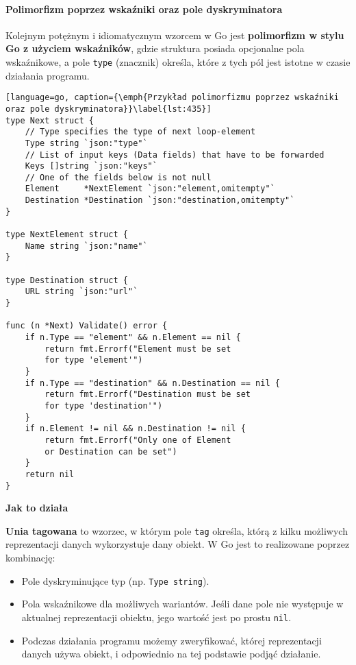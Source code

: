\paragraph{Polimorfizm poprzez wskaźniki oraz pole dyskryminatora}

Kolejnym potężnym i idiomatycznym wzorcem w Go jest \textbf{polimorfizm w stylu Go z użyciem wskaźników}, gdzie struktura posiada opcjonalne pola wskaźnikowe, a pole \texttt{type} (znacznik) określa, które z tych pól jest istotne w czasie działania programu.

\begin{lstlisting}[language=go, caption={\emph{Przykład polimorfizmu poprzez wskaźniki oraz pole dyskryminatora}}\label{lst:435}]
type Next struct {
	// Type specifies the type of next loop-element
	Type string `json:"type"`
	// List of input keys (Data fields) that have to be forwarded
	Keys []string `json:"keys"`
	// One of the fields below is not null
	Element     *NextElement `json:"element,omitempty"`
	Destination *Destination `json:"destination,omitempty"`
}

type NextElement struct {
	Name string `json:"name"`
}

type Destination struct {
	URL string `json:"url"`
}

func (n *Next) Validate() error {
	if n.Type == "element" && n.Element == nil {
		return fmt.Errorf("Element must be set 
        for type 'element'")
	}
	if n.Type == "destination" && n.Destination == nil {
		return fmt.Errorf("Destination must be set 
        for type 'destination'")
	}
	if n.Element != nil && n.Destination != nil {
		return fmt.Errorf("Only one of Element 
        or Destination can be set")
	}
	return nil
}
\end{lstlisting}

\textbf{Jak to działa}

\textbf{Unia tagowana} to wzorzec, w którym pole \texttt{tag} określa, którą z kilku możliwych reprezentacji danych wykorzystuje dany obiekt. W Go jest to realizowane poprzez kombinację:

\begin{itemize}
    \item Pole dyskryminujące typ (np. \texttt{Type string}).
    \item Pola wskaźnikowe dla możliwych wariantów. Jeśli dane pole nie występuje w aktualnej reprezentacji obiektu, jego wartość jest po prostu \texttt{nil}.
    \item Podczas działania programu możemy zweryfikować, której reprezentacji danych używa obiekt, i odpowiednio na tej podstawie podjąć działanie.
\end{itemize}

